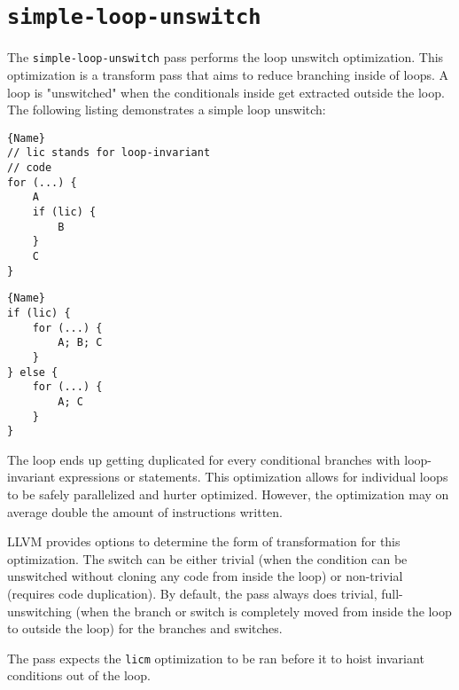 \documentclass[titlepage]{article}
\begin{document}
\section{\texttt{simple-loop-unswitch}} The \texttt{simple-loop-unswitch} pass performs the loop unswitch optimization. This optimization is a transform pass that aims to reduce branching inside of loops. A loop is "unswitched" when the conditionals inside get extracted outside the loop. The following listing demonstrates a simple loop unswitch:

\noindent\begin{minipage}{.45\textwidth}
    \begin{lstlisting}[caption=Before Unswitching,style=customC++]{Name}
// lic stands for loop-invariant
// code
for (...) {
    A
    if (lic) {
        B
    }
    C
}
    \end{lstlisting}
\end{minipage}\hfill
\begin{minipage}{.45\textwidth}
    \begin{lstlisting}[caption=After Unswitching,style=customC++,firstnumber=1]{Name}
if (lic) {
    for (...) {
        A; B; C
    }
} else {
    for (...) {
        A; C
    }
}
    \end{lstlisting}
\end{minipage}

The loop ends up getting duplicated for every conditional branches with loop-invariant expressions or statements. This optimization allows for individual loops to be safely parallelized and hurter optimized. However, the optimization may on average double the amount of instructions written. \cite{loop-unswitch}

LLVM provides options to determine the form of transformation for this optimization. The switch can be either trivial (when the condition can be unswitched without cloning any code from inside the loop) or non-trivial (requires code duplication). By default, the pass always does trivial, full-unswitching (when the branch or switch is completely moved from inside the loop to outside the loop) for the branches and switches. \cite{loop-unswitch-src}

The pass expects the \texttt{licm} optimization to be ran before it to hoist invariant conditions out of the loop.



\end{document}
